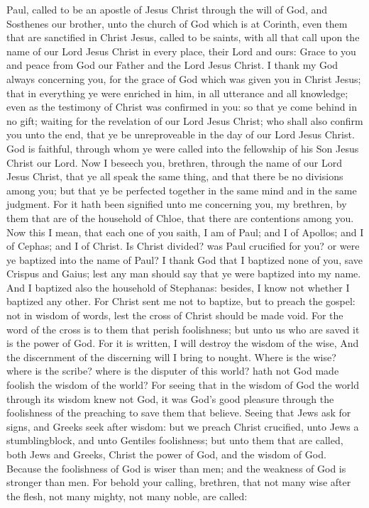 


Paul, called to be an apostle of Jesus Christ through the will of God, and Sosthenes our brother, unto the church of God which is at Corinth, even them that are sanctified in Christ Jesus, called to be saints, with all that call upon the name of our Lord Jesus Christ in every place, their Lord and ours: Grace to you and peace from God our Father and the Lord Jesus Christ.  I thank my God always concerning you, for the grace of God which was given you in Christ Jesus; that in everything ye were enriched in him, in all utterance and all knowledge; even as the testimony of Christ was confirmed in you: so that ye come behind in no gift; waiting for the revelation of our Lord Jesus Christ; who shall also confirm you unto the end, that ye be unreproveable in the day of our Lord Jesus Christ. God is faithful, through whom ye were called into the fellowship of his Son Jesus Christ our Lord.  Now I beseech you, brethren, through the name of our Lord Jesus Christ, that ye all speak the same thing, and that there be no divisions among you; but that ye be perfected together in the same mind and in the same judgment. For it hath been signified unto me concerning you, my brethren, by them that are of the household of Chloe, that there are contentions among you. Now this I mean, that each one of you saith, I am of Paul; and I of Apollos; and I of Cephas; and I of Christ. Is Christ divided? was Paul crucified for you? or were ye baptized into the name of Paul? I thank God that I baptized none of you, save Crispus and Gaius; lest any man should say that ye were baptized into my name. And I baptized also the household of Stephanas: besides, I know not whether I baptized any other. For Christ sent me not to baptize, but to preach the gospel: not in wisdom of words, lest the cross of Christ should be made void.  For the word of the cross is to them that perish foolishness; but unto us who are saved it is the power of God. For it is written, I will destroy the wisdom of the wise, And the discernment of the discerning will I bring to nought.  Where is the wise? where is the scribe? where is the disputer of this world? hath not God made foolish the wisdom of the world? For seeing that in the wisdom of God the world through its wisdom knew not God, it was God’s good pleasure through the foolishness of the preaching to save them that believe. Seeing that Jews ask for signs, and Greeks seek after wisdom: but we preach Christ crucified, unto Jews a stumblingblock, and unto Gentiles foolishness; but unto them that are called, both Jews and Greeks, Christ the power of God, and the wisdom of God. Because the foolishness of God is wiser than men; and the weakness of God is stronger than men.  For behold your calling, brethren, that not many wise after the flesh, not many mighty, not many noble, are called: 